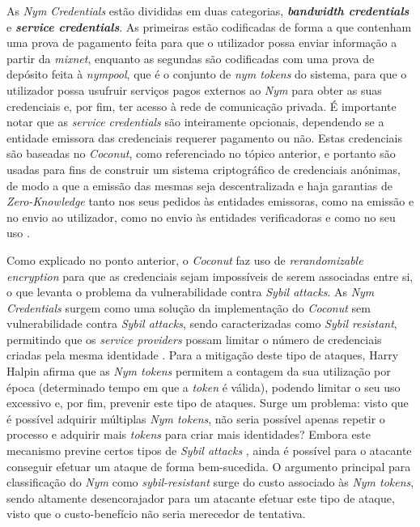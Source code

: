 As \textit{Nym Credentials} estão divididas em duas categorias, \textbf{\textit{bandwidth credentials}} e \textbf{\textit{service credentials}}. As primeiras estão codificadas de forma a que contenham uma prova de pagamento feita para que o utilizador possa enviar informação a partir da \textit{mixnet}, enquanto as segundas são codificadas com uma prova de depósito feita à \textit{nympool}, que é o conjunto de \textit{nym tokens} do sistema, para que o utilizador possa usufruir serviços pagos externos ao \textit{Nym} para obter as suas credenciais e, por fim, ter acesso à rede de comunicação privada. É importante notar que as \textit{service credentials} são inteiramente opcionais, dependendo se a entidade emissora das credenciais requerer pagamento ou não. Estas credenciais são baseadas no \textit{Coconut}, como referenciado no tópico anterior, e portanto são usadas para fins de construir um sistema criptográfico de credenciais anónimas, de modo a que a emissão das mesmas seja descentralizada e haja garantias de \textit{Zero-Knowledge} tanto nos seus pedidos às entidades emissoras, como na emissão e no envio ao utilizador, como no envio às entidades verificadoras e como no seu uso \cite{diaz2021nym}.

Como explicado no ponto anterior, o \textit{Coconut} faz uso de \textit{rerandomizable encryption} para que as credenciais sejam impossíveis de serem associadas entre si, o que levanta o problema da vulnerabilidade contra \textit{Sybil attacks}. As \textit{Nym Credentials} surgem como uma solução da implementação do \textit{Coconut} sem vulnerabilidade contra \textit{Sybil attacks}, sendo caracterizadas como \textit{Sybil resistant}, permitindo que os \textit{service providers} possam limitar o número de credenciais criadas pela mesma identidade \cite{halpin2020nym}. Para a mitigação deste tipo de ataques, Harry Halpin afirma que as \textit{Nym tokens} permitem a contagem da sua utilização por época (determinado tempo em que a \textit{token} é válida), podendo limitar o seu uso excessivo e, por fim, prevenir este tipo de ataques. Surge um problema: visto que é possível adquirir múltiplas \textit{Nym tokens}, não seria possível apenas repetir o processo e adquirir mais \textit{tokens} para criar mais identidades? Embora este mecanismo previne certos tipos de \textit{Sybil attacks} \cite{halpin2020nym}, ainda é possível para o atacante conseguir efetuar um ataque de forma bem-sucedida. O argumento principal para classificação do \textit{Nym} como \textit{sybil-resistant} surge do custo associado às \textit{Nym tokens}, sendo altamente desencorajador para um atacante efetuar este tipo de ataque, visto que o custo-benefício não seria merecedor de tentativa.

